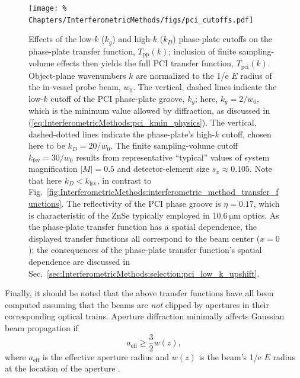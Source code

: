 \begin{figure}
  \centering
  \texttt{[image: \%
    Chapters/InterferometricMethods/figs/pci\_cutoffs.pdf]}
  \caption[Effects of phase-plate and finite sampling-volume cutoffs
      on the PCI transfer function]{%
    Effects of the low-$k$ ($k_g$) and high-$k$ ($k_D$) phase-plate cutoffs
    on the phase-plate transfer function, $T_{\text{pp}}(k)$;
    inclusion of finite sampling-volume effects
    then yields the full PCI transfer function, $T_{\text{pci}}(k)$.
    Object-plane wavenumbers $k$ are normalized
    to the 1/e $E$ radius of the in-vessel probe beam, $w_0$.
    The vertical, dashed lines indicate
    the low-$k$ cutoff of the PCI phase-plate groove, $k_g$;
    here, $k_g = 2 / w_0$,
    which is the minimum value allowed by diffraction,
    as discussed in
    (\ref{eq:InterferometricMethods:pci_kmin_physics}).
    The vertical, dashed-dotted lines indicate
    the phase-plate's high-$k$ cutoff,
    chosen here to be $k_D = 20 / w_0$.
    The finite sampling-volume cutoff $k_{\text{fsv}} = 30 / w_0$
    results from representative ``typical'' values of
    system magnification $|M| = 0.5$ and
    detector-element size $s_x \approx 0.105$.
    Note that here $k_D < k_{\text{fsv}}$, in contrast to
    Fig.~\ref{fig:InterferometricMethods:interferometric_method_transfer_functions}.
    The reflectivity of the PCI phase groove is $\eta = 0.17$,
    which is characteristic of the ZnSe typically
    employed in $\SI{10.6}{\micro\meter}$ optics.
    As the phase-plate transfer function has a spatial dependence,
    the displayed transfer functions all correspond
    to the beam center ($x = 0$);
    the consequences of
    the phase-plate transfer function's spatial dependence
    are discussed in
    Sec.~\ref{sec:InterferometricMethods:selection:pci_low_k_upshift}.
  }
\label{fig:InterferometricMethods:pci_cutoffs}
\end{figure}

Finally, it should be noted that the above transfer functions
have all been computed assuming that the beams are \emph{not} clipped
by apertures in their corresponding optical trains.
Aperture diffraction minimally affects Gaussian beam propagation if
\begin{equation}
  a_{\text{eff}} \geq \frac{3}{2} w(z),
  \label{eq:InterferometricMethods:aperture_radius_for_minimal_diffraction}
\end{equation}
where $a_{\text{eff}}$ is the effective aperture radius and
$w(z)$ is the beam's 1/e $E$ radius at the location of the aperture
\cite{campbell_josa69, rost_diffraction_pc14}.


